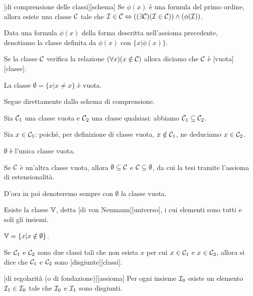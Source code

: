 \begin{Axiom}
	[di comprensione delle classi][schema] Se $\phi(x)$ \`e una formula del primo ordine, allora esiste una classe $\mathcal{C}$ tale che $\mathcal{I} \in \mathcal{C} \Leftrightarrow \left ( (\exists \mathcal{C})(\mathcal{I} \in \mathcal{C}) \right ) \wedge \left ( \phi(\mathcal{I}) \right )$.
\end{Axiom}
\par Data una formula $\phi(x)$ della forma descritta nell'assioma precedente, denotiamo la classe definita da $\phi(x)$ con $\lbrace x | \phi(x) \rbrace$.
\begin{Definition}
	Se la classe $\mathcal{C}$ verifica la relazione $(\forall x)(x \notin \mathcal{C})$ allora diciamo che $\mathcal{C}$ \`e [vuota][classe].
\end{Definition}
\begin{Theorem}
	La classe $\emptyset = \lbrace x | x \neq x \rbrace$ \`e vuota.
\end{Theorem}
\Proof Segue direttamente dallo schema di comprensione. \EndProof
\begin{Theorem}
	Sia $\mathcal{C}_1$ una classe vuota e $\mathcal{C}_2$ una classe qualsiasi: abbiamo $\mathcal{C}_1 \subseteq \mathcal{C}_2$.
\end{Theorem}
\Proof Sia $x \in \mathcal{C}_1$: poich\'e, per definizione di classe vuota, $x \notin \mathcal{C}_1$, ne deduciamo $x \in \mathcal{C}_2$. \EndProof
\begin{Corollary}
	$\emptyset$ \`e l'unica classe vuota.
\end{Corollary}
\Proof Se $\mathcal{C}$ \`e un'altra classe vuota, allora $\emptyset \subseteq \mathcal{C}$ e $\mathcal{C} \subseteq \emptyset$, da cui la tesi tramite l'assioma di estensionalit\`a. \EndProof
\par D'ora in poi denoteremo sempre con $\emptyset$ la classe vuota.
\begin{Theorem}
	Esiste la classe $\mathbb{V}$, detta [di von Neumann][universo], i cui elementi sono tutti e soli gli insiemi.
\end{Theorem}
\Proof $\mathbb{V} = \lbrace x | x \notin \emptyset \rbrace$. \EndProof
\begin{Definition}
	Se $\mathcal{C}_1$ e $\mathcal{C}_2$ sono due classi tali che non esista $x$ per cui $x \in \mathcal{C}_1$ e $x \in \mathcal{C}_2$, allora si dice che $\mathcal{C}_1$ e $\mathcal{C}_2$ sono [disgiunte][classi].
\end{Definition}
\begin{Axiom}
	[di regolarit\`a (o di fondazione)][assioma] Per ogni insieme $\mathcal{I}_0$ esiste un elemento $\mathcal{I}_1 \in \mathcal{I}_0$ tale che $\mathcal{I}_0$ e $\mathcal{I}_1$ sono disgiunti.
\end{Axiom}
